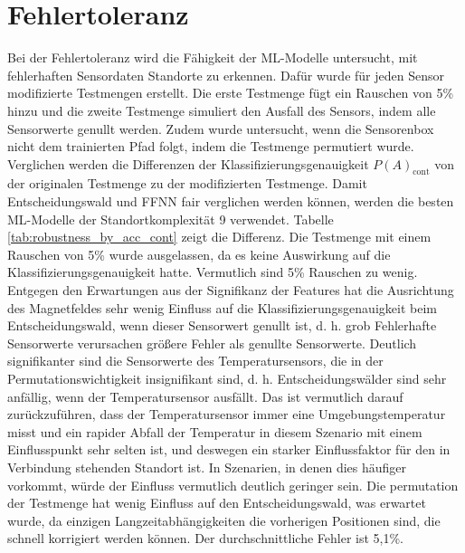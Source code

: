 \section{Fehlertoleranz}
Bei der Fehlertoleranz wird die Fähigkeit der ML-Modelle untersucht, mit fehlerhaften Sensordaten Standorte zu erkennen.
Dafür wurde für jeden Sensor modifizierte Testmengen erstellt.
Die erste Testmenge fügt ein Rauschen von 5\% hinzu und die zweite Testmenge simuliert den Ausfall des Sensors, indem alle Sensorwerte genullt werden.
Zudem wurde untersucht, wenn die Sensorenbox nicht dem trainierten Pfad folgt, indem die Testmenge permutiert wurde.
Verglichen werden die Differenzen der Klassifizierungsgenauigkeit $P(A)_{\text{cont}}$ von der originalen Testmenge zu der modifizierten Testmenge.
Damit Entscheidungswald und FFNN fair verglichen werden können, werden die besten ML-Modelle der Standortkomplexität 9 verwendet.
\newline
\newline
Tabelle \ref{tab:robustness_by_acc_cont} zeigt die Differenz.
Die Testmenge mit einem Rauschen von 5\% wurde ausgelassen, da es keine Auswirkung auf die Klassifizierungsgenauigkeit hatte.
Vermutlich sind 5\% Rauschen zu wenig.
Entgegen den Erwartungen aus der Signifikanz der Features hat die Ausrichtung des Magnetfeldes sehr wenig Einfluss auf die Klassifizierungsgenauigkeit beim Entscheidungswald,
wenn dieser Sensorwert genullt ist, d. h. grob Fehlerhafte Sensorwerte verursachen größere Fehler als genullte Sensorwerte.
Deutlich signifikanter sind die Sensorwerte des Temperatursensors, die in der Permutationswichtigkeit insignifikant sind,
d. h. Entscheidungswälder sind sehr anfällig, wenn der Temperatursensor ausfällt.
Das ist vermutlich darauf zurückzuführen, dass der Temperatursensor immer eine Umgebungstemperatur misst und
ein rapider Abfall der Temperatur in diesem Szenario mit einem Einflusspunkt sehr selten ist, und deswegen ein
starker Einflussfaktor für den in Verbindung stehenden Standort ist.
In Szenarien, in denen dies häufiger vorkommt, würde der Einfluss vermutlich deutlich geringer sein.
Die permutation der Testmenge hat wenig Einfluss auf den Entscheidungswald, was erwartet wurde,
da einzigen Langzeitabhängigkeiten die vorherigen Positionen sind, die schnell korrigiert werden können.
Der durchschnittliche Fehler ist 5,1\%.
